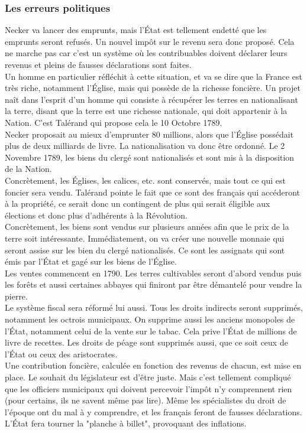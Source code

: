 \documentclass[10pt, a4paper, openany]{book}
\begin{document}
\subsubsection{Les erreurs politiques}

Necker va lancer des emprunts, mais l'État est tellement endetté que les emprunts seront refusés. Un nouvel impôt sur le revenu sera donc proposé. Cela ne marche pas car c'est un système où les contribuables doivent déclarer leurs revenus et pleins de fausses déclarations sont faites. \\
Un homme en particulier réfléchit à cette situation, et va se dire que la France est très riche, notamment l'Église, mais qui possède de la richesse foncière. Un projet naît dans l'esprit d'un homme qui consiste à récupérer les terres en nationalisant la terre, disant que la terre est une richesse nationale, qui doit appartenir à la Nation. C'est Talérand qui propose cela le 10 Octobre 1789. \\
Necker proposait au mieux d'emprunter 80 millions, alors que l'Église possédait plus de deux milliards de livre. La nationalisation va donc être ordonné. Le 2 Novembre 1789, les biens du clergé sont nationalisés et sont mis à la disposition de la Nation. \\
Concrètement, les Églises, les calices, etc. sont conservés, mais tout ce qui est foncier sera vendu. Talérand pointe le fait que ce sont des français qui accéderont à la propriété, ce serait donc un contingent de plus qui serait éligible aux élections et donc plus d'adhérents à la Révolution. \\
Concrètement, les biens sont vendus sur plusieurs années afin que le prix de la terre soit intéressante. Immédiatement, on va créer une nouvelle monnaie qui seront assise sur les bien du clergé nationalisés. Ce sont les assignats qui sont émis par l'État et gagé sur les biens de l'Église. \\
Les ventes commencent en 1790. Les terres cultivables seront d'abord vendus puis les forêts et aussi certaines abbayes qui finiront par être démantelé pour vendre la pierre. \\
Le système fiscal sera réformé lui aussi. Tous les droits indirects seront supprimés, notamment les octrois municipaux. On supprime aussi les anciens monopoles de l'État, notamment celui de la vente sur le tabac. Cela prive l'État de millions de livre de recettes. Les droits de péage sont supprimés aussi, que ce soit ceux de l'État ou ceux des aristocrates. \\
Une contribution foncière, calculée en fonction des revenus de chacun, est mise en place. Le souhait du législateur est d'être juste. Mais c'est tellement compliqué que les officiers municipaux qui doivent percevoir l'impôt n'y comprennent rien (pour certains, ils ne savent même pas lire). Même les spécialistes du droit de l'époque ont du mal à y comprendre, et les français feront de fausses déclarations. \\
L'État fera tourner la "planche à billet", provoquant des inflations. 
\end{document}

